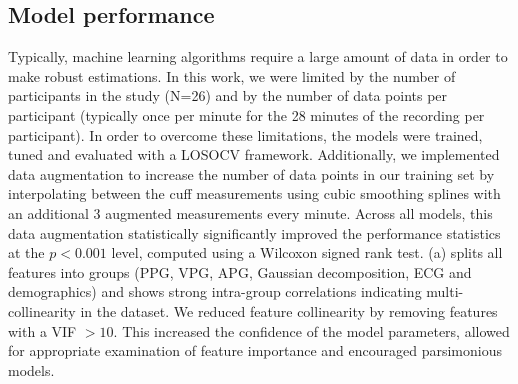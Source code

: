 \documentclass[fleqn,10pt]{wlscirep}
\begin{document}
\subsection{Model performance}


Typically, machine learning algorithms require a large amount of data in order to make robust estimations. In this work, we were limited by the number of participants in the study (N=26) and by the number of data points per participant (typically once per minute for the 28 minutes of the recording per participant). In order to overcome these limitations, the models were trained, tuned and evaluated with a LOSOCV framework. Additionally, we implemented data augmentation to increase the number of data points in our training set by interpolating between the cuff measurements using cubic smoothing splines with an additional 3 augmented measurements every minute. Across all models, this data augmentation statistically significantly improved the performance statistics at the $p < 0.001$ level, computed using a Wilcoxon signed rank test.  (a) splits all features into groups (PPG, VPG, APG, Gaussian decomposition, ECG and demographics) and shows strong intra-group correlations indicating multi-collinearity in the dataset. We reduced feature collinearity by removing features with a VIF $> 10$. This increased the confidence of the model parameters, allowed for appropriate examination of feature importance and encouraged parsimonious models.  
\end{document}
